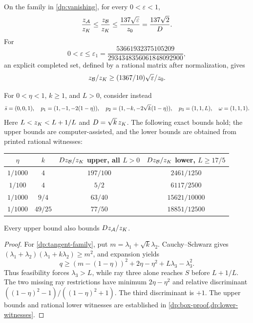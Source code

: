\begin{theorem}\label{dp:certified-sharpness}
On the family in \cref{dp:vanishing}, for every $0<\varepsilon<1$,
\[
 \frac{z_{\mathcal A}}{z_K}\le\frac{z_{\mathcal B}}{z_K}\le
 \frac{137\sqrt\varepsilon}{z_0}=\frac{137\sqrt2}{D}.
\]
For
\[
 0<\varepsilon\le
 \varepsilon_1=\frac{53661932375105209}{2934348356061848092900},
\]
an explicit completed set, defined by a rational matrix after normalization,
gives
\[
 z_{\mathcal B}/z_K\ge(1367/10)\sqrt\varepsilon/z_0.
\]

For $0<\eta<1$, $k\ge1$, and $L>0$, consider instead
\begin{equation}\label{dp:tangent-family}
 \bar s=(0,0,1),\quad p_1=(1,-1,-2(1-\eta)),\quad
 p_2=(1,-k,-2\sqrt k(1-\eta)),\quad p_3=(1,1,L),\quad \omega=(1,1,1).
\end{equation}
Here $L<z_K<L+1/L$ and $D=\sqrt k\,z_K$. The following exact bounds hold;
the upper bounds are computer-assisted, and the lower bounds are obtained
from printed rational witnesses:
\begin{center}
\begin{tabular}{@{}cccc@{}}\toprule
 $\eta$ & $k$ & $Dz_{\mathcal B}/z_K$ upper, all $L>0$ &
 $Dz_{\mathcal B}/z_K$ lower, $L\ge17/5$\\\midrule
 $1/1000$ & $4$ & $197/100$ & $2461/1250$\\
 $1/100$ & $4$ & $5/2$ & $6117/2500$\\
 $1/1000$ & $9/4$ & $63/40$ & $15621/10000$\\
 $1/1000$ & $49/25$ & $77/50$ & $18851/12500$\\\bottomrule
\end{tabular}
\end{center}
Every upper bound also bounds $Dz_{\mathcal A}/z_K$.
\end{theorem}

\begin{proof}
For \cref{dp:tangent-family}, put $m=\lambda_1+\sqrt k\lambda_2$.
Cauchy--Schwarz gives
$(\lambda_1+\lambda_2)(\lambda_1+k\lambda_2)\ge m^2$, and expansion yields
\[
 q\ge (m-(1-\eta))^2+2\eta-\eta^2+L\lambda_3-\lambda_3^2.
\]
Thus feasibility forces $\lambda_3>L$, while ray three alone reaches $S$
before $L+1/L$. The two missing ray restrictions have minimum
$2\eta-\eta^2$ and relative discriminant
$((1-\eta)^2-1)/((1-\eta)^2+1)$. The third discriminant is $+1$.
The upper bounds and rational lower witnesses are established in
\cref{dp:box-proof,dp:lower-witnesses}.
\end{proof}

